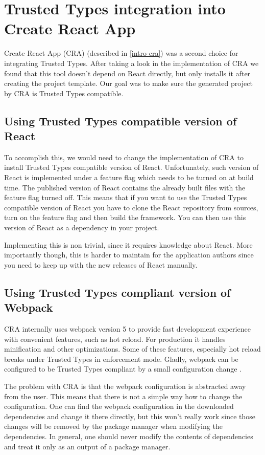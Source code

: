 \chapter{Trusted Types integration into Create React App}

Create React App (CRA) (described in \ref{intro-cra}) was a second choice for integrating Trusted
Types. After taking a look in the implementation of CRA we found that this tool doesn't depend on
React directly, but only installs it after creating the project template. Our goal was to make sure
the generated project by CRA is Trusted Types compatible.

\section{Using Trusted Types compatible version of React}

To accomplish this, we would need to change the implementation of CRA to install Trusted Types
compatible version of React. Unfortunately, such version of React is implemented under a feature
flag which needs to be turned on at build time. The published version of React contains the already
built files with the feature flag turned off. This means that if you want to use the Trusted Types
compatible version of React you have to clone the React repository from sources, turn on the feature
flag and then build the framework. You can then use this version of React as a dependency in your
project.

Implementing this is non trivial, since it requires knowledge about React. More importantly though,
this is harder to maintain for the application authors since you need to keep up with the new
releases of React manually.

\section{Using Trusted Types compliant version of Webpack}

CRA internally uses webpack version 5 to provide fast development experience with convenient
features, such as hot reload. For production it handles minification and other optimizations. Some
of these features, especially hot reload breaks under Trusted Types in enforcement mode. Gladly,
webpack can be configured to be Trusted Types compliant by a small configuration change
\cite{webpack_tt_config}.

The problem with CRA is that the webpack configuration is abstracted away from the user. This means
that there is not a simple way how to change the configuration. One can find the webpack
configuration in the downloaded dependencies and change it there directly, but this won't really
work since those changes will be removed by the package manager when modifying the dependencies. In
general, one should never modify the contents of dependencies and treat it only as an output of a
package manager.


